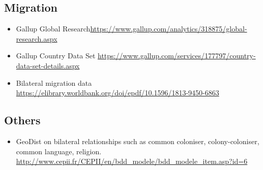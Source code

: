\documentclass[10pt]{article} %
\begin{document}
    \subsection{Migration}
        \begin{itemize}
            \item Gallup Global Research\url{https://www.gallup.com/analytics/318875/global-research.aspx}
            \item Gallup Country Data Set \url{https://www.gallup.com/services/177797/country-data-set-details.aspx}
            \item Bilateral migration data \url{https://elibrary.worldbank.org/doi/epdf/10.1596/1813-9450-6863}
        \end{itemize}

    \subsection{Others}
        \begin{itemize}
            \item GeoDist on bilateral relationships such as common coloniser, colony-coloniser, common language, religion. \url{http://www.cepii.fr/CEPII/en/bdd_modele/bdd_modele_item.asp?id=6}
        \end{itemize}

\newpage

\footnotesize


\end{document}
